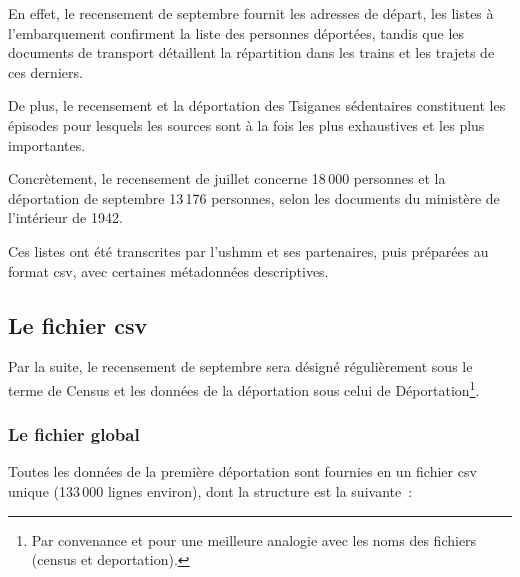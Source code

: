 \documentclass[a4paper,12pt,twoside]{book}
\begin{document}
			    En effet, le recensement de septembre fournit les adresses de départ, les listes à l'embarquement confirment la liste des personnes déportées, tandis que les documents de transport détaillent la répartition dans les trains et les trajets de ces derniers.
			    \newline
			    
			    De plus, le recensement et la déportation des Tsiganes \og{}sédentaires\fg{} constituent les épisodes pour lesquels les sources sont à la fois les plus exhaustives et les plus importantes.

			    Concrètement, le recensement de juillet concerne 18\,000 personnes et la déportation de septembre 13\,176 personnes, selon les documents du ministère de l’intérieur de 1942.
                \newline
                
			     Ces listes ont été transcrites par l'\gls{ushmm} et ses partenaires, puis préparées au format \acrshort{csv}, avec certaines métadonnées descriptives.
			     \pagebreak
			    
            \subsection[La source au format \glsentryshort{csv}]{Le fichier \acrshort{csv}}
            
            Par la suite, le recensement de septembre sera désigné régulièrement sous le terme de \og{}Census\fg{} et les données de la déportation sous celui de \og{}Déportation\fg{}\footnote{Par convenance et pour une meilleure analogie avec les noms des fichiers (census et deportation).}.
            
                \subsubsection{Le fichier global}
			    
                    Toutes les données de la première déportation sont fournies en un fichier \acrshort{csv} unique (133\,000 lignes environ), dont la structure est la suivante~:
    			    
\end{document}
